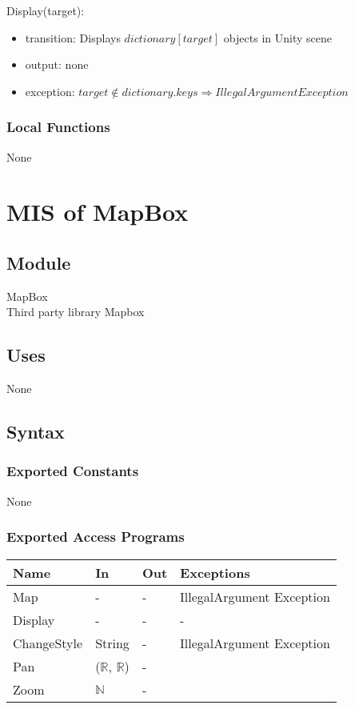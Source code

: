 \documentclass[12pt, titlepage]{article}
\begin{document}
\noindent Display(target):
\begin{itemize}
\item transition: Displays $dictionary[target]$ objects in Unity scene
\item output: none
\item exception: $target \notin dictionary.keys \Rightarrow IllegalArgument Exception$
\end{itemize}

\subsubsection{Local Functions}

None

\newpage

\section{MIS of MapBox} \label{mMap}

\subsection{Module}

MapBox\\
Third party library Mapbox

\subsection{Uses}

None

\subsection{Syntax}

\subsubsection{Exported Constants}

None

\subsubsection{Exported Access Programs}

\begin{center}
\begin{tabular}{p{2cm} p{4cm} p{4cm} p{2cm}}
\hline
\textbf{Name} & \textbf{In} & \textbf{Out} & \textbf{Exceptions} \\
\hline
Map & - & - & IllegalArgument Exception\\
Display & - & - & - \\
ChangeStyle & String & - & IllegalArgument Exception\\
Pan & ($\mathbb{R}$, $\mathbb{R}$) & -\\
Zoom &  $\mathbb{N}$ & -\\

\hline
\end{tabular}
\end{center}
\end{document}
